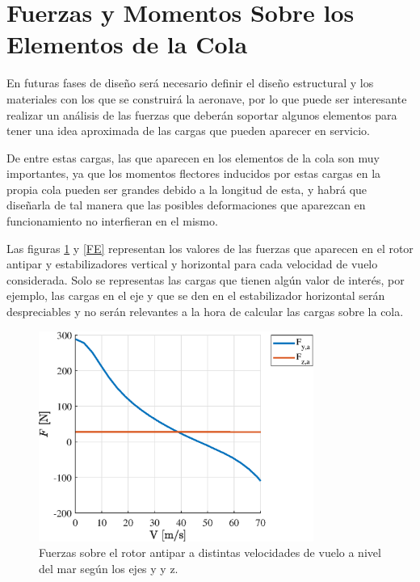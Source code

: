 \section{Fuerzas y Momentos Sobre los Elementos de la Cola}

En futuras fases de diseño será necesario definir el diseño estructural y los materiales con los que se construirá la aeronave, por lo que puede ser interesante realizar un análisis de las fuerzas que deberán soportar algunos elementos para tener una idea aproximada de las cargas que pueden aparecer en servicio.

De entre estas cargas, las que aparecen en los elementos de la cola son muy importantes, ya que los momentos flectores inducidos por estas cargas en la propia cola pueden ser grandes debido a la longitud de esta, y habrá que diseñarla de tal manera que las posibles deformaciones que aparezcan en funcionamiento no interfieran en el mismo.

Las figuras \ref{FAP} y \ref{FE} representan los valores de las fuerzas que aparecen en el rotor antipar y estabilizadores vertical y horizontal para cada velocidad de vuelo considerada. Solo se representas las cargas que tienen algún valor de interés, por ejemplo, las cargas en el eje y que se den en el estabilizador horizontal serán despreciables y no serán relevantes a la hora de calcular las cargas sobre la cola.

\begin{figure}
	\centering
	\includegraphics[width=90mm]{graficos/FAP}
	\caption{Fuerzas sobre el rotor antipar a distintas velocidades de vuelo a nivel del mar según los ejes y y z.}
	\label{FAP}
\end{figure}

